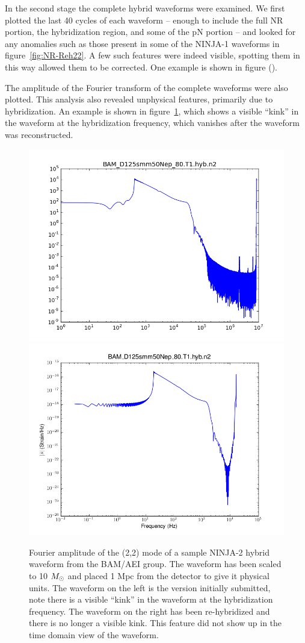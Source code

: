 In the second stage the complete hybrid waveforms were examined.
We first plotted the last 40 cycles of each waveform -- enough to
include the full NR portion, the hybridization region, and some of the
pN portion -- and looked for any anomalies such as those present in
some of the NINJA-1 waveforms in figure~\ref{fig:NR-Reh22}.  A few such
features were indeed visible, spotting them in this way allowed them
to be corrected.  One example is shown in figure ().

The amplitude of the Fourier transform of the complete waveforms were
also plotted.  This analysis also revealed unphysical features, 
primarily due to hybridization.  An example is shown in
figure~\ref{f:ninja2_freq_hybrids}, which shows a visible ``kink'' in
the waveform at the hybridization frequency, which vanishes after the
waveform was reconstructed.

\begin{figure}
  \includegraphics[width=0.5\linewidth]{figures/ninja2/bam_d125smm50nep_80_t1_hyb_n2_amp.png}
  \includegraphics[width=0.5\linewidth]{figures/ninja2/bam_d125smm50nep_80_t1_hyb_n2_amp_v2.png}
  \caption[Frequency-domain hybrid NINJA-2 waveforms]{
  \label{f:ninja2_freq_hybrids}
Fourier amplitude of the (2,2) mode of a sample NINJA-2 hybrid
waveform from the BAM/AEI group.  The waveform has been scaled to 10
$M_\odot$ and placed 1 Mpc from the detector to give it physical units.
 The waveform on the left is the version
initially submitted, note there is a visible ``kink'' in the waveform
at the hybridization frequency.  The waveform on the right has been
re-hybridized and there is no longer a visible kink.  This feature did
not show up in the time domain view of the waveform.}
\end{figure}%


